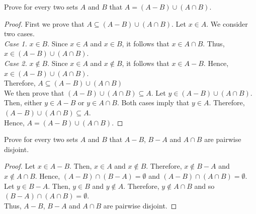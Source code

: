 \documentclass[12pt]{article}
\newenvironment{problem}[2][Problem]{\begin{trivlist}
		\item[\hskip \labelsep {\bfseries #1}\hskip \labelsep {\bfseries #2.}]}{\end{trivlist}}
\begin{document}
	\begin{problem}{49}
		Prove for every two sets $A$ and $B$ that $A=(A-B)\cup(A\cap B)$.
		\begin{proof}
			First we prove that $A\subseteq (A-B)\cup(A\cap B)$. Let $x\in A$. We consider two cases.\\
			\textit{Case 1.} $x\in B$. Since $x\in A$ and $x\in B$, it follows that $x\in A\cap B$. Thus, $x \in (A-B)\cup(A\cap B)$.\\
			\textit{Case 2.} $x \not\in B$. Since $x\in A$ and $x \not\in B$, it follows that $x\in A-B$. Hence, $x\in (A-B)\cup(A\cap B)$.\\
			Therefore, $A\subseteq (A-B)\cup(A\cap B)$\\
			
			We then prove that $(A-B)\cup(A\cap B)\subseteq A$. Let $y\in (A-B)\cup(A\cap B)$. Then, either $y\in A-B$ or $y\in A\cap B$. Both cases imply that $y\in A$. Therefore, $(A-B)\cup(A\cap B)\subseteq A$.\\
			Hence, $A=(A-B)\cup(A\cap B)$.
		\end{proof}
	\end{problem} 

	\begin{problem}{50}
		Prove for every two sets $A$ and $B$ that $A-B$, $B-A$ and $A\cap B$ are pairwise disjoint.
		\begin{proof}
			Let $x\in A-B$. Then, $x\in A$ and $x\not\in B$. Therefore, $x\not\in B-A$ and $x\not\in A\cap B$. Hence, $(A-B) \cap (B-A) = \emptyset$ and $(A-B) \cap (A\cap B) = \emptyset$.\\
			
			Let $y \in B-A$. Then, $y\in B$ and $y\not\in A$. Therefore, $y\not\in A\cap B$ and so $(B-A)\cap (A\cap B) = \emptyset$.\\
			Thus, $A-B$, $B-A$ and $A\cap B$ are pairwise disjoint.
		\end{proof}
	\end{problem}
\end{document}
